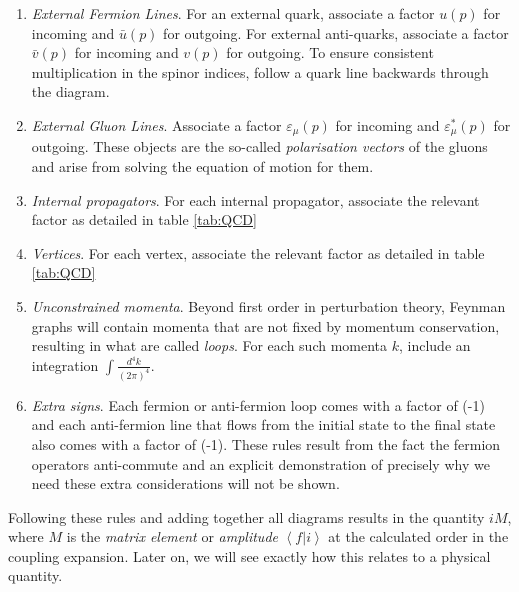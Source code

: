 \begin{enumerate}
\item{\emph{External Fermion Lines}. For an external quark, associate a factor $u(p)$ for incoming and $\bar{u}(p)$ for outgoing. For external anti-quarks, associate a factor $\bar{v}(p)$ for incoming and $v(p)$ for outgoing. To ensure consistent multiplication in the spinor indices, follow a quark line backwards through the diagram.}
\item{\emph{External Gluon Lines}.  Associate a factor $\varepsilon_\mu(p)$ for incoming and $\varepsilon^*_\mu(p)$ for outgoing. These objects are the so-called \emph{polarisation vectors} of the gluons and arise from solving the equation of motion for them.}
\item{\emph{Internal propagators}. For each internal propagator, associate the relevant factor as detailed in table \ref{tab:QCD}}
\item{\emph{Vertices}. For each vertex, associate the relevant factor as detailed in table \ref{tab:QCD}}
\item{\emph{Unconstrained momenta}. Beyond first order in perturbation theory, Feynman graphs will contain momenta that are not fixed by momentum conservation, resulting in what are called \emph{loops}. For each such momenta $k$, include an integration $\int \frac{d^4 k}{(2 \pi)^4}$. }
\item{\emph{Extra signs}. Each fermion or anti-fermion loop comes with a factor of (-1) and each anti-fermion line that flows from the initial state to the final state also comes with a factor of (-1). These rules result from the fact the fermion operators anti-commute and an explicit demonstration of precisely why we need these extra considerations will not be shown.}
\end{enumerate}

Following these rules and adding together all diagrams results in the quantity $i M$, where $M$ is the \emph{matrix element} or \emph{amplitude} $\left<f | i \right>$ at the calculated order in the coupling expansion. Later on, we will see exactly how this relates to a physical quantity. 

